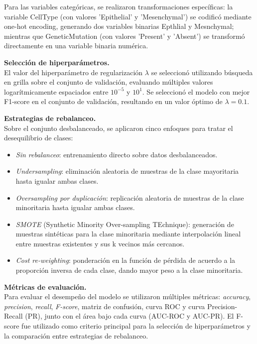 Para las variables categóricas, se realizaron transformaciones específicas: la variable CellType (con valores 'Epithelial' y 'Mesenchymal') se codificó mediante one-hot encoding, generando dos variables binarias Epthlial y Mesnchymal; mientras que GeneticMutation (con valores 'Present' y 'Absent') se transformó directamente en una variable binaria numérica.

\vspace{0.3cm}
\noindent \textbf{Selección de hiperparámetros.} \\
El valor del hiperparámetro de regularización $\lambda$ se seleccionó utilizando búsqueda en grilla sobre el conjunto de validación, evaluando múltiples valores logarítmicamente espaciados entre $10^{-5}$ y $10^1$. Se seleccionó el modelo con mejor F1-score en el conjunto de validación, resultando en un valor óptimo de $\lambda = 0.1$.

\vspace{0.3cm}
\noindent \textbf{Estrategias de rebalanceo.} \\
Sobre el conjunto desbalanceado, se aplicaron cinco enfoques para tratar el desequilibrio de clases:
\begin{itemize}
    \item \textit{Sin rebalanceo}: entrenamiento directo sobre datos desbalanceados.
    \item \textit{Undersampling}: eliminación aleatoria de muestras de la clase mayoritaria hasta igualar ambas clases.
    \item \textit{Oversampling por duplicación}: replicación aleatoria de muestras de la clase minoritaria hasta igualar ambas clases.
    \item \textit{SMOTE} (Synthetic Minority Over-sampling TEchnique): generación de muestras sintéticas para la clase minoritaria mediante interpolación lineal entre muestras existentes y sus k vecinos más cercanos.
    \item \textit{Cost re-weighting}: ponderación en la función de pérdida de acuerdo a la proporción inversa de cada clase, dando mayor peso a la clase minoritaria.
\end{itemize}

\vspace{0.3cm}
\noindent \textbf{Métricas de evaluación.} \\
Para evaluar el desempeño del modelo se utilizaron múltiples métricas: \textit{accuracy}, \textit{precision}, \textit{recall}, \textit{F-score}, matriz de confusión, curva ROC y curva Precision-Recall (PR), junto con el área bajo cada curva (AUC-ROC y AUC-PR). El F-score fue utilizado como criterio principal para la selección de hiperparámetros y la comparación entre estrategias de rebalanceo.

